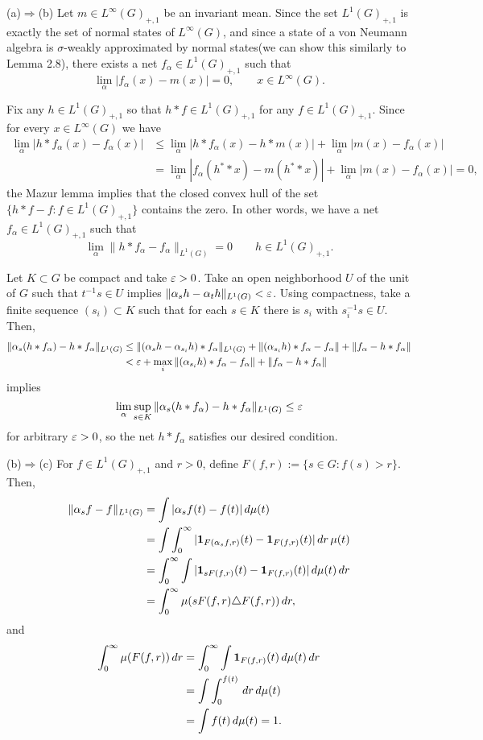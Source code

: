 \documentclass{../../small}
\begin{document}
\begin{pf}
(a)$\Rightarrow$(b)
Let $m\in L^\infty(G)_{+,1}$ be an invariant mean.
Since the set $L^1(G)_{+,1}$ is exactly the set of normal states of $L^\infty(G)$, and since a state of a von Neumann algebra is $\sigma$-weakly approximated by normal states(we can show this similarly to Lemma 2.8), there exists a net $f_\alpha\in L^1(G)_{+,1}$ such that
\[\lim_\alpha|f_\alpha(x)-m(x)|=0,\qquad x\in L^\infty(G).\]

Fix any $h\in L^1(G)_{+,1}$ so that $h*f\in L^1(G)_{+,1}$ for any $f\in L^1(G)_{+,1}$.
Since for every $x\in L^\infty(G)$ we have
\begin{align*}
\lim_\alpha|h*f_\alpha(x)-f_\alpha(x)|
&\le\lim_\alpha|h*f_\alpha(x)-h*m(x)|+\lim_\alpha|m(x)-f_\alpha(x)|\\
&=\lim_\alpha|f_\alpha(h^**x)-m(h^**x)|+\lim_\alpha|m(x)-f_\alpha(x)|=0,
\end{align*}
the Mazur lemma implies that the closed convex hull of the set $\{h*f-f:f\in L^1(G)_{+,1}\}$ contains the zero.
In other words, we have a net $f_\alpha\in L^1(G)_{+,1}$ such that
\[\lim_\alpha\|h*f_\alpha-f_\alpha\|_{L^1(G)}=0\qquad h\in L^1(G)_{+,1}.\]

Let $K\subset G$ be compact and take $\varepsilon>0$.
Take an open neighborhood $U$ of the unit of $G$ such that $t^{-1}s\in U$ implies $\|\alpha_sh-\alpha_th\|_{L^1(G)}<\varepsilon$.
Using compactness, take a finite sequence $(s_i)\subset K$ such that for each $s\in K$ there is $s_i$ with $s_i^{-1}s\in U$.
Then,
\begin{align*}
\|\alpha_s(h*f_\alpha)-h*f_\alpha\|_{L^1(G)}
&\le\|(\alpha_sh-\alpha_{s_i}h)*f_\alpha\|_{L^1(G)}+\|(\alpha_{s_i}h)*f_\alpha-f_\alpha\|+\|f_\alpha-h*f_\alpha\|\\
&<\varepsilon+\max_i\|(\alpha_{s_i}h)*f_\alpha-f_\alpha\|+\|f_\alpha-h*f_\alpha\|
\end{align*}
implies
\[\lim_\alpha\sup_{s\in K}\|\alpha_s(h*f_\alpha)-h*f_\alpha\|_{L^1(G)}\le\varepsilon\]
for arbitrary $\varepsilon>0$, so the net $h*f_\alpha$ satisfies our desired condition.

(b)$\Rightarrow$(c)
For $f\in L^1(G)_{+,1}$ and $r>0$, define $F(f,r):=\{s\in G:f(s)>r\}$.
Then,
\begin{align*}
\|\alpha_sf-f\|_{L^1(G)}
&=\int|\alpha_sf(t)-f(t)|\,d\mu(t)\\
&=\int\int_0^\infty|\mathbf{1}_{F(\alpha_sf,r)}(t)-\mathbf{1}_{F(f,r)}(t)|\,dr\,\mu(t)\\
&=\int_0^\infty\int|\mathbf{1}_{sF(f,r)}(t)-\mathbf{1}_{F(f,r)}(t)|\,d\mu(t)\,dr\\
&=\int_0^\infty\mu(sF(f,r)\triangle F(f,r))\,dr,
\end{align*}
and
\begin{align*}
\int_0^\infty\mu(F(f,r))\,dr
&=\int_0^\infty\int\mathbf{1}_{F(f,r)}(t)\,d\mu(t)\,dr\\
&=\int\int_0^{f(t)}\,dr\,d\mu(t)\\
&=\int f(t)\,d\mu(t)=1.
\end{align*}


\end{pf}
\end{document}
